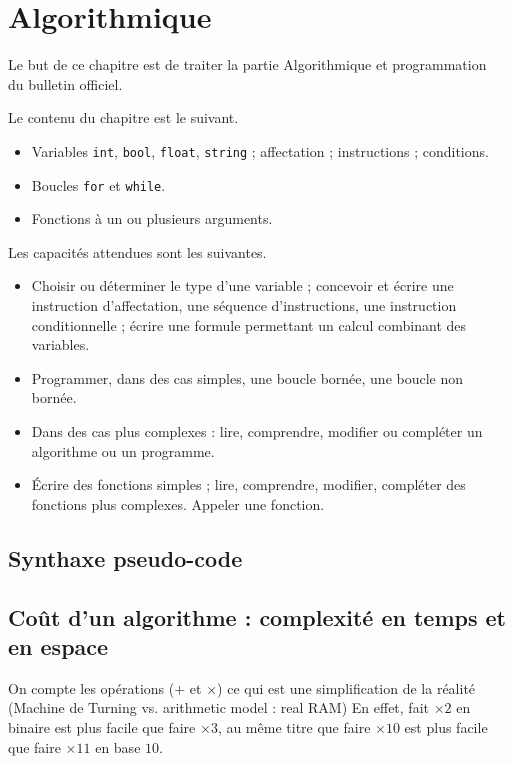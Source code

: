 
\chapter{Algorithmique}

Le but de ce chapitre est de traiter la partie \og Algorithmique et programmation \fg~ du bulletin officiel.

Le contenu du chapitre est le suivant.
	\begin{itemize}
		\item Variables \texttt{int}, \texttt{bool}, \texttt{float}, \texttt{string} ; affectation ; instructions ; conditions.
		\item Boucles \texttt{for} et \texttt{while}.
		\item Fonctions à un ou plusieurs arguments.
	\end{itemize}

Les capacités attendues sont les suivantes.
	\begin{itemize}
		\item Choisir ou déterminer le type d'une variable ; concevoir et écrire une instruction d'affectation, une séquence d'instructions, une instruction conditionnelle ; écrire une formule permettant un calcul combinant des variables.
		\item Programmer, dans des cas simples, une boucle bornée, une boucle non bornée.
		\item Dans des cas plus complexes : lire, comprendre, modifier ou compléter un algorithme ou un programme.
		\item Écrire des fonctions simples ; lire, comprendre, modifier, compléter des fonctions plus complexes. Appeler une fonction.
	\end{itemize}

\section{Synthaxe pseudo-code}



\section{Coût d'un algorithme : complexité en temps et en espace}

On compte les opérations ($+$ et $\times$) ce qui est une simplification de la réalité (Machine de Turning vs. arithmetic model : real RAM)
En effet, fait $\times 2$ en binaire est plus facile que faire $\times3$, au même titre que faire $\times10$ est plus facile que faire $\times11$ en base $10$.

